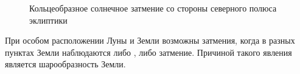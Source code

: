 \begin{figure}[h!]
    \caption{Кольцеобразное солнечное затмение со стороны северного полюса эклиптики}
    \label{fig:eclipses-circle-solar-eslipse}
\end{figure}
При особом расположении Луны и Земли возможны  затмения, когда в разных пунктах Земли наблюдаются либо , либо  затмение. Причиной такого явления является шарообразность Земли.

